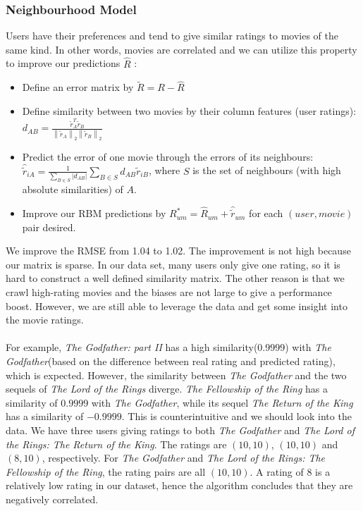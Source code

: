 \begin{CJK*}{UTF8}{gbsn}
\subsubsection{Neighbourhood Model}
Users have their preferences and tend to give similar ratings to movies of the same kind. In other words, movies are correlated and we can utilize this property to improve our predictions $ \hat{R} $ :
\begin{itemize}
    \item Define an error matrix by $ \widetilde{R} = R - \hat{R} $
    \item Define similarity between two movies by their column features (user ratings): $ d_{A B}=\frac{\tilde{r}_{A}^{T} \widetilde{r}_{B}}{\left\|\widetilde{r}_{A}\right\|_{2}\left\|\widetilde{r}_{B}\right\|_{2}} $
    \item Predict the error of one movie through the errors of its neighbours: $ \hat{\tilde{r}}_{i A}=\frac{1}{\sum_{B \in S}\left|d_{A B}\right|} \sum_{B \in S} d_{A B} \widetilde{r}_{i B}  $, where $ S $ is the set of neighbours (with high absolute similarities) of $ A $.
    \item Improve our RBM predictions by $ R_{u m}^{*}=\hat{R}_{u m}+\hat{\tilde{r}}_{u m} $ for each $ (user, movie) $ pair desired.
\end{itemize}
We improve the RMSE from 1.04 to 1.02. The improvement is not high because our matrix is sparse. In our data set, many users only give one rating, so it is hard to construct a well defined similarity matrix. The other reason is that we crawl high-rating movies and the biases are not large to give a performance boost. However, we are still able to leverage the data and get some insight into the movie ratings. \\\\
For example, \textit{The Godfather: part II} has a high similarity($ 0.9999 $) with \textit{The Godfather}(based on the difference between real rating and predicted rating), which is expected. However, the similarity between \textit{The Godfather} and the two sequels of \textit{The Lord of the Rings} diverge. \textit{The Fellowship of the Ring} has a similarity of $ 0.9999 $ with \textit{The Godfather}, while its sequel \textit{The Return of the King } has a similarity of $-0.9999 $. This is counterintuitive and we should look into the data. We have three users giving ratings to both \textit{The Godfather} and \textit{The Lord of the Rings: The Return of the King}. The ratings are $ (10, 10) $, $ (10, 10) $ and $ (8, 10) $, respectively. For \textit{The Godfather} and \textit{The Lord of the Rings: The Fellowship of the Ring}, the rating pairs are all $ (10, 10) $. A rating of 8 is a relatively low rating in our dataset, hence the algorithm concludes that they are negatively correlated.


\end{CJK*}
